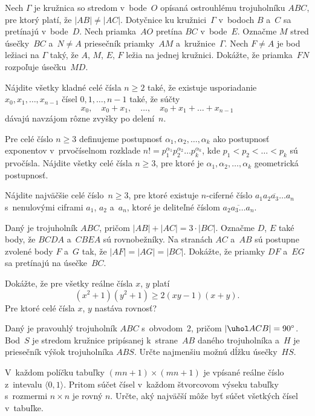 {%
Nech $\Gamma$ je kružnica so stredom v~bode~$O$ opísaná ostrouhlému trojuholníku $ABC$, pre ktorý platí, že $|AB|\ne|AC|$. Dotyčnice ku kružnici~$\Gamma$ v~bodoch $B$ a~$C$ sa pretínajú v~bode~$D$. Nech priamka~$AO$ pretína $BC$ v~bode~$E$. Označme $M$ stred úsečky~$BC$ a~$N \ne A$ priesečník priamky~$AM$ a~kružnice~$\Gamma$. Nech $F \ne A$ je bod ležiaci na $\Gamma$ taký, že $A$, $M$, $E$, $F$ ležia na jednej kružnici. Dokážte, že priamka~$FN$ rozpoľuje úsečku~$MD$.
}

{%
Nájdite všetky kladné celé čísla $n\ge 2$ také, že existuje usporiadanie $x_0,x_1,\dots,x_{n-1}$ čísel $0,1, \dots, n-1$ také, že súčty
$$
x_0,\quad x_0+x_1,\quad \dots,\quad x_0+x_1+\ldots+x_{n-1}
$$
dávajú navzájom rôzne zvyšky po delení~$n$.
}

{%
Pre celé číslo $n \ge 3$ definujeme postupnosť $\alpha_1,\alpha_2, \dots, \alpha_k$ ako postupnosť exponentov v~prvočíselnom rozklade $n!=p_1^{\alpha_1}p_2^{\alpha_2} \dots p_k^{\alpha_k}$, kde $p_1< p_2< \dots <p_k$ sú prvočísla.
Nájdite všetky celé čísla $n \ge 3$, pre ktoré je $\alpha_1,\alpha_2, \dots, \alpha_k$ geometrická postupnosť.
}

{%
Nájdite najväčšie celé číslo~$n\ge 3$, pre ktoré existuje $n$-ciferné číslo $\overline{a_1a_2a_3\ldots a_n}$ s~nenulovými
ciframi $a_1$, $a_2$ a~$a_n$, ktoré je deliteľné číslom $\overline{a_2a_3\ldots a_n}$.}

{%
Daný je trojuholník $ABC$, pričom $|AB|+|AC|=3 \cdot |BC|$. Označme $D$, $E$ také body, že $BCDA$ a~$CBEA$ sú rovnobežníky. Na stranách $AC$ a~$AB$ sú postupne zvolené body $F$ a~$G$ tak, že $|AF|=|AG|=|BC|$. Dokážte, že priamky $DF$ a~$EG$ sa pretínajú na úsečke~$BC$.}

{%
Dokážte, že pre všetky reálne čísla $x$, $y$ platí
$$(x^2+1)(y^2+1) \ge 2(xy-1)(x+y).$$
Pre ktoré celé čísla $x$, $y$ nastáva rovnosť?}

{%
Daný je pravouhlý trojuholník $ABC$ s~obvodom~$2$, pričom $|\uhol ACB|=90^\circ$. Bod~$S$ je stredom kružnice pripísanej k~strane~$AB$ daného trojuholníka a~$H$ je priesečník výšok trojuholníka $ABS$. Určte najmenšiu možnú dĺžku úsečky~$HS$.}

{%
V~každom políčku tabuľky $(mn+1)\times (mn+1)$ je vpísané reálne číslo z~intevalu $\langle0,1\rangle$. Pritom súčet čísel v~každom štvorcovom výseku tabuľky s~rozmermi $n\times n$ je rovný $n$. Určte, aký najväčší môže byť súčet všetkých čísel v~tabuľke.}

